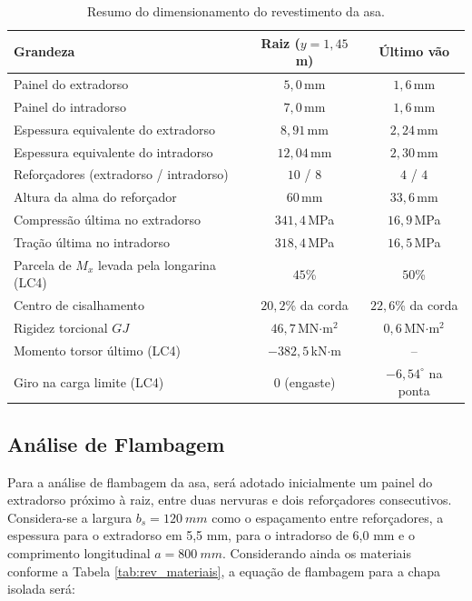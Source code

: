 \begin{table}[H]
\centering
\caption{Resumo do dimensionamento do revestimento da asa.}
\label{tab:rev_resumo}
\begin{tabular}{lcc}
\toprule
\textbf{Grandeza} & \textbf{Raiz} (\boldmath$y = 1{,}45$ \textbf{m}) & \textbf{Último vão} \\
\midrule
Painel do extradorso                      & $5{,}0$\,mm                     & $1{,}6$\,mm \\
Painel do intradorso                      & $7{,}0$\,mm                     & $1{,}6$\,mm \\
Espessura equivalente do extradorso     & $8{,}91$\,mm                  & $2{,}24$\,mm \\
Espessura equivalente do intradorso     & $12{,}04$\,mm                  & $2{,}30$\,mm \\
Reforçadores (extradorso / intradorso)  & $10$ / $8$             & $4$ / $4$ \\
Altura da alma do reforçador            & $60$\,mm                       & $33{,}6$\,mm \\
Compressão última no extradorso         & $341{,}4$\,MPa                & $16{,}9$\,MPa \\
Tração última no intradorso             & $318{,}4$\,MPa                & $16{,}5$\,MPa \\
Parcela de $M_x$ levada pela longarina (LC4) & $45$\%              & $50$\% \\
Centro de cisalhamento                  & $20{,}2$\% da corda             & $22{,}6$\% da corda \\
Rigidez torcional $GJ$                  & $46{,}7$\,MN$\cdot$m$^2$         & $0{,}6$\,MN$\cdot$m$^2$ \\
Momento torsor último (LC4)            & $-382{,}5$\,kN$\cdot$m              & -- \\
Giro na carga limite (LC4)              & 0 (engaste)                     & $-6{,}54^\circ$ na ponta \\
\bottomrule
\end{tabular}
\end{table}

\subsection{Análise de Flambagem}

Para a análise de flambagem da asa, será adotado inicialmente um painel do extradorso próximo à raiz, entre duas nervuras e dois reforçadores consecutivos. Considera-se a largura $b_s=120\ mm$ como o espaçamento entre reforçadores, a espessura para o extradorso em 5,5 mm, para o intradorso de 6,0 mm e o comprimento longitudinal $a = 800\ mm$. Considerando ainda os materiais conforme a Tabela \ref{tab:rev_materiais}, a equação de flambagem para a chapa isolada será: 

